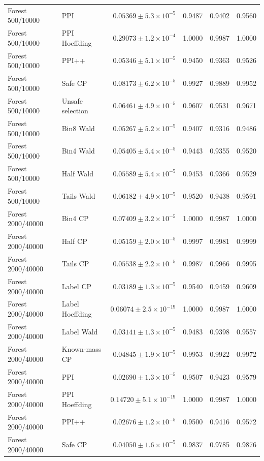 \begin{longtable}{llrrrr}
Forest 500/10000 & PPI & $0.05369\pm 5.3\times 10^{-5}$ & 0.9487 & 0.9402 & 0.9560 \\
Forest 500/10000 & PPI Hoeffding & $0.29073\pm 1.2\times 10^{-4}$ & 1.0000 & 0.9987 & 1.0000 \\
Forest 500/10000 & PPI++ & $0.05346\pm 5.1\times 10^{-5}$ & 0.9450 & 0.9363 & 0.9526 \\
Forest 500/10000 & Safe CP & $0.08173\pm 6.2\times 10^{-5}$ & 0.9927 & 0.9889 & 0.9952 \\
Forest 500/10000 & Unsafe selection & $0.06461\pm 4.9\times 10^{-5}$ & 0.9607 & 0.9531 & 0.9671 \\
Forest 500/10000 & Bin8 Wald & $0.05267\pm 5.2\times 10^{-5}$ & 0.9407 & 0.9316 & 0.9486 \\
Forest 500/10000 & Bin4 Wald & $0.05405\pm 5.4\times 10^{-5}$ & 0.9443 & 0.9355 & 0.9520 \\
Forest 500/10000 & Half Wald & $0.05589\pm 5.4\times 10^{-5}$ & 0.9453 & 0.9366 & 0.9529 \\
Forest 500/10000 & Tails Wald & $0.06182\pm 4.9\times 10^{-5}$ & 0.9520 & 0.9438 & 0.9591 \\
Forest 2000/40000 & Bin4 CP & $0.07409\pm 3.2\times 10^{-5}$ & 1.0000 & 0.9987 & 1.0000 \\
Forest 2000/40000 & Half CP & $0.05159\pm 2.0\times 10^{-5}$ & 0.9997 & 0.9981 & 0.9999 \\
Forest 2000/40000 & Tails CP & $0.05538\pm 2.2\times 10^{-5}$ & 0.9987 & 0.9966 & 0.9995 \\
Forest 2000/40000 & Label CP & $0.03189\pm 1.3\times 10^{-5}$ & 0.9540 & 0.9459 & 0.9609 \\
Forest 2000/40000 & Label Hoeffding & $0.06074\pm 2.5\times 10^{-19}$ & 1.0000 & 0.9987 & 1.0000 \\
Forest 2000/40000 & Label Wald & $0.03141\pm 1.3\times 10^{-5}$ & 0.9483 & 0.9398 & 0.9557 \\
Forest 2000/40000 & Known-mass CP & $0.04845\pm 1.9\times 10^{-5}$ & 0.9953 & 0.9922 & 0.9972 \\
Forest 2000/40000 & PPI & $0.02690\pm 1.3\times 10^{-5}$ & 0.9507 & 0.9423 & 0.9579 \\
Forest 2000/40000 & PPI Hoeffding & $0.14720\pm 5.1\times 10^{-19}$ & 1.0000 & 0.9987 & 1.0000 \\
Forest 2000/40000 & PPI++ & $0.02676\pm 1.2\times 10^{-5}$ & 0.9500 & 0.9416 & 0.9572 \\
Forest 2000/40000 & Safe CP & $0.04050\pm 1.6\times 10^{-5}$ & 0.9837 & 0.9785 & 0.9876 \\

\end{longtable}
